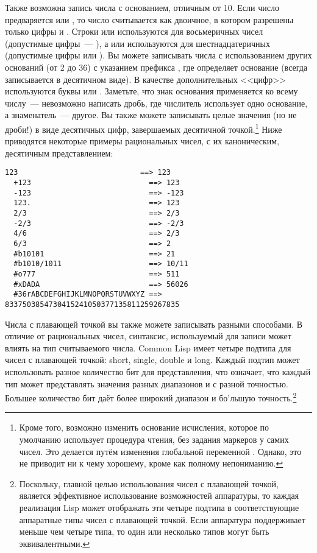 Также возможна запись числа с основанием, отличным от 10.  Если число предваряется
 или , то число считывается как двоичное, в котором разрешены только
цифры  и .  Строки  или  используются для восьмеричных
чисел (допустимые цифры~--- ), а  или  используются для
шестнадцатеричных (допустимые цифры  или ).  Вы можете записывать
числа с использованием других оснований (от 2 до 36) с указанием префикса , где
 определяет основание (всегда записывается в десятичном виде).  В качестве
дополнительных <<цифр>> используются буквы  или .  Заметьте, что знак
основания применяется ко всему числу~--- невозможно написать дробь, где числитель
использует одно основание, а знаменатель~--- другое.  Вы также можете записывать целые
значения (но не дроби!) в виде десятичных цифр, завершаемых десятичной
точкой.\footnote{Кроме того, возможно изменить основание исчисления, которое по умолчанию
  использует процедура чтения, без задания маркеров у самих чисел. Это делается путём
  изменения глобальной переменной .  Однако, это не приводит ни к чему
  хорошему, кроме как полному непониманию.}  Ниже приводятся некоторые примеры
рациональных чисел, с их каноническим, десятичным представлением:

\begin{lstlisting}[style=lisprepl]
  123                            ==> 123
  +123                           ==> 123
  -123                           ==> -123
  123.                           ==> 123
  2/3                            ==> 2/3
  -2/3                           ==> -2/3
  4/6                            ==> 2/3
  6/3                            ==> 2
  #b10101                        ==> 21
  #b1010/1011                    ==> 10/11
  #o777                          ==> 511
  #xDADA                         ==> 56026
  #36rABCDEFGHIJKLMNOPQRSTUVWXYZ ==> 8337503854730415241050377135811259267835
\end{lstlisting}

Числа с плавающей точкой вы также можете записывать разными способами.  В отличие от
рациональных чисел, синтаксис, используемый для записи может влиять на тип считываемого
числа.  Common Lisp имеет четыре подтипа для чисел с плавающей точкой: short, single,
double и long.  Каждый подтип может использовать разное количество бит для представления,
что означает, что каждый тип может представлять значения разных диапазонов и с разной
точностью.  Большее количество бит даёт более широкий диапазон и бо'льшую
точность.\footnote{Поскольку, главной целью использования чисел с плавающей точкой,
  является эффективное использование возможностей аппаратуры, то каждая реализация Lisp
  может отображать эти четыре подтипа в соответствующие аппаратные типы чисел с плавающей
  точкой.  Если аппаратура поддерживает меньше чем четыре типа, то один или несколько
  типов могут быть эквивалентными.}


